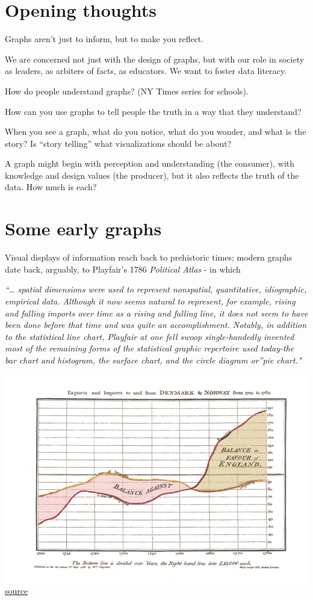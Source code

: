 \documentclass[openany]{book}
\begin{document}
\hypertarget{opening-thoughts}{%
\section{Opening thoughts}\label{opening-thoughts}}

Graphs aren't just to inform, but to make you reflect.

We are concerned not just with the design of graphs, but with our role in society as leaders, as arbiters of facts, as educators. We want to foster data literacy.

How do people understand graphs? (NY Times series for schools).

How can you use graphs to tell people the truth in a way that they understand?

When you see a graph, what do you notice, what do you wonder, and what is the story? Is ``story telling'' what visualizations should be about?

A graph might begin with perception and understanding (the consumer), with knowledge and design values (the producer), but it also reflects the truth of the data. How much is each?

\hypertarget{some-early-graphs}{%
\section{Some early graphs}\label{some-early-graphs}}

Visual displays of information reach back to prehistoric times; modern graphs date back, arguably, to Playfair's 1786 \emph{Political Atlas} - in which

\emph{``\ldots{} spatial dimensions were used to represent nonspatial, quantitative, idiographic, empirical data. Although it now seems natural to represent, for example, rising and falling imports over time as a rising and falling line, it does not seem to have been done before that time and was quite an accomplishment. Notably, in addition to the statistical line chart, Playfair at one fell swoop single-handedly invented most of the remaining forms of the statistical graphic repertoire used today-the bar chart and histogram, the surface chart, and the circle diagram or''pie chart."}

\includegraphics{playfair1786.PNG}\href{https://robots.thoughtbot.com/analyzing-minards-visualization-of-napoleons-1812-march}{source}
\end{document}
